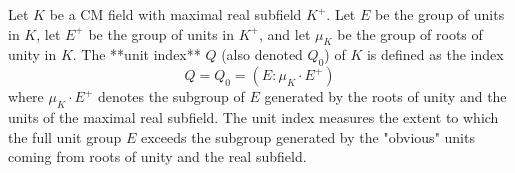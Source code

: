 Let $K$ be a CM field with maximal real subfield $K^+$. Let $E$ be the group of units in $K$, let $E^+$ be the group of units in $K^+$, and let $\mu_K$ be the group of roots of unity in $K$. The **unit index** $Q$ (also denoted $Q_0$) of $K$ is defined as the index
$$Q = Q_0 = (E : \mu_K \cdot E^+)$$
where $\mu_K \cdot E^+$ denotes the subgroup of $E$ generated by the roots of unity and the units of the maximal real subfield. The unit index measures the extent to which the full unit group $E$ exceeds the subgroup generated by the "obvious" units coming from roots of unity and the real subfield.
